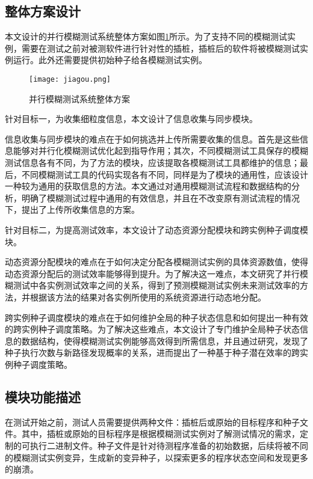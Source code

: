 \documentclass[master]{thesis-uestc}
\begin{document}
\subsection{整体方案设计}
本文设计的并行模糊测试系统整体方案如图\ref{jiagou}所示。为了支持不同的模糊测试实例，需要在测试之前对被测软件进行针对性的插桩，插桩后的软件将被模糊测试实例运行。此外还需要提供初始种子给各模糊测试实例。
\begin{figure}[!htbp]
    \vspace{6pt}
    \centering
    \texttt{[image: jiagou.png]}
    \caption{并行模糊测试系统整体方案}
    \label{jiagou}
\end{figure}

针对目标一，为收集细粒度信息，本文设计了信息收集与同步模块。

信息收集与同步模块的难点在于如何挑选并上传所需要收集的信息。首先是这些信息能够对并行化模糊测试优化起到指导作用；其次，不同模糊测试工具保存的模糊测试信息各有不同，为了方法的模块，应该提取各模糊测试工具都维护的信息；最后，不同模糊测试工具的代码实现各有不同，同样是为了模块的通用性，应该设计一种较为通用的获取信息的方法。本文通过对通用模糊测试流程和数据结构的分析，明确了模糊测试过程中通用的有效信息，并且在不改变原有测试流程的情况下，提出了上传所收集信息的方案。

针对目标二，为提高测试效率，本文设计了动态资源分配模块和跨实例种子调度模块。

动态资源分配模块的难点在于如何决定分配各模糊测试实例的具体资源数值，使得动态资源分配后的测试效率能够得到提升。为了解决这一难点，本文研究了并行模糊测试中各实例测试效率之间的关系，得到了预测模糊测试实例未来测试效率的方法，并根据该方法的结果对各实例所使用的系统资源进行动态地分配。

跨实例种子调度模块的难点在于如何维护全局的种子状态信息和如何提出一种有效的跨实例种子调度策略。为了解决这些难点，本文设计了专门维护全局种子状态信息的数据结构，使得模糊测试实例能够高效得到所需信息，并且通过研究，发现了种子执行次数与新路径发现概率的关系，进而提出了一种基于种子潜在效率的跨实例种子调度策略。

\subsection{模块功能描述}

在测试开始之前，测试人员需要提供两种文件：插桩后或原始的目标程序和种子文件。其中，插桩或原始的目标程序是根据模糊测试实例对了解测试情况的需求，定制的可执行二进制文件。种子文件是针对待测程序准备的初始数据，后续将被不同的模糊测试实例变异，生成新的变异种子，以探索更多的程序状态空间和发现更多的崩溃。
\end{document}
